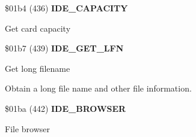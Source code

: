 \$01b4 (436) \textbf{IDE\_CAPACITY}

Get card capacity


\$01b7 (439) \textbf{IDE\_GET\_LFN}

Get long filename

Obtain a long file name and other file information.


\$01ba (442) \textbf{IDE\_BROWSER}

File browser

